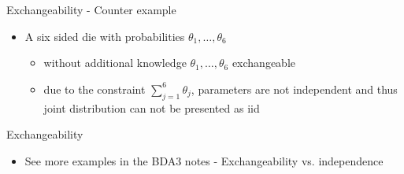 \documentclass[finnish,english,t]{beamer}
\begin{document}
\begin{frame}{Exchangeability - Counter example}

  \begin{itemize}
  \item A six sided die with probabilities %
    $\theta_1,\ldots,\theta_6$
    \begin{itemize}
    \item without additional knowledge $\theta_1,\ldots,\theta_6$
      exchangeable
    \item due to the constraint $\sum_{j=1}^6\theta_j$, parameters
      are not independent and thus joint distribution can not be
      presented as iid %
    \end{itemize}
  \end{itemize}
\end{frame}

 \begin{frame}

   {\Large\color{navyblue} Exchangeability}

   \begin{itemize}
   \item See more examples in the BDA3 notes - Exchangeability vs. independence
   \end{itemize}

 \end{frame}
\end{document}
